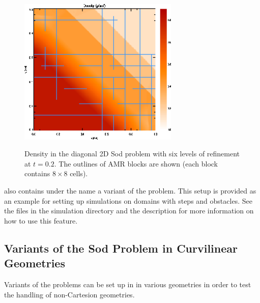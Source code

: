 \begin{figure}[!ht]
\begin{center}
{\leavevmode\includegraphics[width=3in]{Sod_2d_density}}
\end{center}
\caption{\label{Fig:Sod density} Density in the diagonal 2D Sod problem
with six levels of refinement at $t=0.2$. The outlines of AMR blocks are
shown (each block contains $8\times8$ cells).
}
\end{figure}

\begin{flashtip}
\flashx also contains under the name 
a variant of the  problem. This setup is provided as an example for
setting up simulations on domains with steps and obstacles. See
the files in the  simulation directory
and the  description for 
more information on how to use this feature.
\end{flashtip}

\subsection{Variants of the Sod Problem in Curvilinear Geometries}
\label{Sec:SimulationSodCurvi}
Variants of the  problems can be set up in in various 
geometries in order to test the handling of non-Cartesion geometries.

